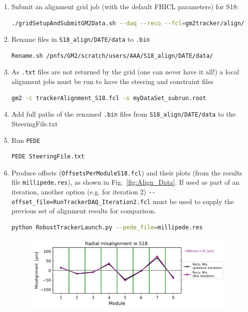 \documentclass[12pt]{article}
\begin{document}
\begin{enumerate}
    \item Submit an alignment grid job (with the default FHICL parameters) for S18:
    \begin{lstlisting}[language=bash]
     ./gridSetupAndSubmitGM2Data.sh --daq --reco --fcl=gm2tracker/align/fcl/trackerAlignment_S18.fcl --localArea --output-dir=/pnfs/GM2/scratch/users/AAA/S18_align --sam-dataset=myDataSet --multipleroot --njobs=450 \end{lstlisting}
     \item Rename files in \verb!S18_align/DATE/data! to \verb!.bin!
     \begin{lstlisting}[language=bash] 
     Rename.sh /pnfs/GM2/scratch/users/AAA/S18_align/DATE/data/\end{lstlisting}
     \item As \verb!.txt! files are not returned by the grid (one can never have it all!) a local alignment jobs must be run to have the steering and constraint files
     \begin{lstlisting}[language=bash] 
     gm2 -c trackerAlignment_S18.fcl -s myDataSet_subrun.root \end{lstlisting}
     \item Add full paths of the renamed \verb!.bin! files from \verb!S18_align/DATE/data! to the SteeringFile.txt
     \item Run \texttt{PEDE}
     \begin{lstlisting}[language=bash] 
     PEDE SteeringFile.txt \end{lstlisting}
     \item Produce offsets (\verb!OffsetsPerModuleS18.fcl!) and their plots (from the results file \verb!millipede.res!), as shown in Fig.~\ref{fig:Align_Data}. If used as part of an iteration, another option (e.g. for iteration 2) \lstinline{--offset_file=RunTrackerDAQ_Iteration2.fcl} must be used to supply the previous set of alignment results for comparison.
     \begin{lstlisting}[language=bash] 
     python RobustTrackerLaunch.py --pede_file=millipede.res \end{lstlisting}
     \begin{figure}[ht!]
        \centering
        \includegraphics[width = 0.7\linewidth]{fig/Align_Data.png}

\end{figure}
\end{enumerate}
\end{document}

